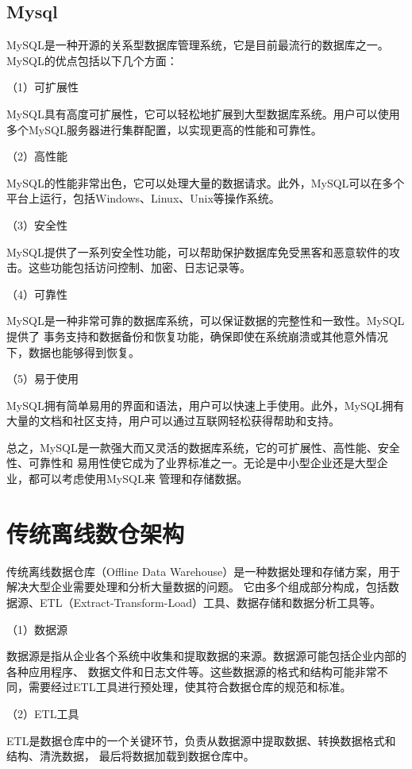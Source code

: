 \subsection{Mysql}

MySQL是一种开源的关系型数据库管理系统，它是目前最流行的数据库之一\cite{42}。MySQL的优点包括以下几个方面：

（1）可扩展性

MySQL具有高度可扩展性，它可以轻松地扩展到大型数据库系统。用户可以使用多个MySQL服务器进行集群配置，以实现更高的性能和可靠性。

（2）高性能

MySQL的性能非常出色，它可以处理大量的数据请求。此外，MySQL可以在多个平台上运行，包括Windows、Linux、Unix等操作系统。

（3）安全性

MySQL提供了一系列安全性功能，可以帮助保护数据库免受黑客和恶意软件的攻击。这些功能包括访问控制、加密、日志记录等。

（4）可靠性

MySQL是一种非常可靠的数据库系统，可以保证数据的完整性和一致性。MySQL提供了
事务支持和数据备份和恢复功能，确保即使在系统崩溃或其他意外情况下，数据也能够得到恢复。

（5）易于使用

MySQL拥有简单易用的界面和语法，用户可以快速上手使用。此外，MySQL拥有大量的文档和社区支持，用户可以通过互联网轻松获得帮助和支持。

总之，MySQL是一款强大而又灵活的数据库系统，它的可扩展性、高性能、安全性、可靠性和
易用性使它成为了业界标准之一。无论是中小型企业还是大型企业，都可以考虑使用MySQL来
管理和存储数据。

\section{传统离线数仓架构}

传统离线数据仓库（Offline Data Warehouse）是一种数据处理和存储方案，用于解决大型企业需要处理和分析大量数据的问题\cite{27}。
它由多个组成部分构成，包括数据源、ETL（Extract-Transform-Load）工具、数据存储和数据分析工具等。

（1）数据源

数据源是指从企业各个系统中收集和提取数据的来源。数据源可能包括企业内部的各种应用程序、
数据文件和日志文件等。这些数据源的格式和结构可能非常不同，需要经过ETL工具进行预处理，使其符合数据仓库的规范和标准。

（2）ETL工具

ETL是数据仓库中的一个关键环节，负责从数据源中提取数据、转换数据格式和结构、清洗数据，
最后将数据加载到数据仓库中。

